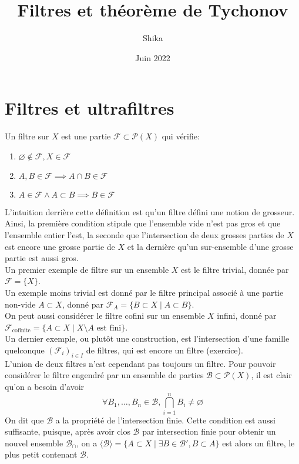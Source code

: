 \documentclass{article}
\title{Filtres et théorème de Tychonov}
\author{Shika}
\date{Juin 2022}
\begin{document}
\maketitle


\section{Filtres et ultrafiltres}
\begin{definition}
    Un filtre sur $X$ est une partie $\mathcal{F} \subset \mathcal{P}(X)$ qui vérifie:
    \begin{enumerate}
        \item $\varnothing \not\in \mathcal{F}, X \in \mathcal{F}$
        \item $A, B \in \mathcal{F} \implies A \cap B \in \mathcal{F}$
        \item $A \in \mathcal{F} \land A \subset B \implies B \in \mathcal{F}$
    \end{enumerate}
\end{definition}

L'intuition derrière cette définition est qu'un filtre défini une notion de grosseur.\\
Ainsi, la première condition stipule que l'ensemble vide n'est pas gros et que l'ensemble entier l'est, la seconde que l'intersection de deux grosses parties de $X$ est encore une grosse partie de $X$ et la dernière qu'un sur-ensemble d'une grosse partie est aussi gros.\\

Un premier exemple de filtre sur un ensemble $X$ est le filtre trivial, donnée par $\mathcal{F} = \{X\}$.\\ Un exemple moins trivial est donné par le filtre principal associé à une partie non-vide $A \subset X$, donné par $\mathcal{F}_A = \{B \subset X \mid A \subset B\}$.\\
On peut aussi considérer le filtre cofini sur un ensemble $X$ infini, donné par $\mathcal{F}_{\text{cofinite}} = \{A \subset X \mid X\setminus A \text{ est fini}\}$.\\
Un dernier exemple, ou plutôt une construction, est l'intersection d'une famille quelconque $(\mathcal{F}_i)_{i \in I}$ de filtres, qui est encore un filtre (exercice).\\
L'union de deux filtres n'est cependant pas toujours un filtre.
Pour pouvoir considérer le filtre engendré par un ensemble de parties $\mathcal{B} \subset \mathcal{P}(X)$, il est clair qu'on a besoin d'avoir
$$\forall B_1, \ldots, B_n \in \mathcal{B}, \bigcap_{i=1}^{n}{B_i} \neq \varnothing$$
On dit que $\mathcal{B}$ a la propriété de l'intersection finie. Cette condition est aussi suffisante, puisque, après avoir clos $\mathcal{B}$ par intersection finie pour obtenir un nouvel ensemble $\mathcal{B}_\cap$, on a $\langle \mathcal{B} \rangle = \{A \subset X \mid \exists B \in \mathcal{B}', B \subset A\}$ est alors un filtre, le plus petit contenant $\mathcal{B}$.
\end{document}
